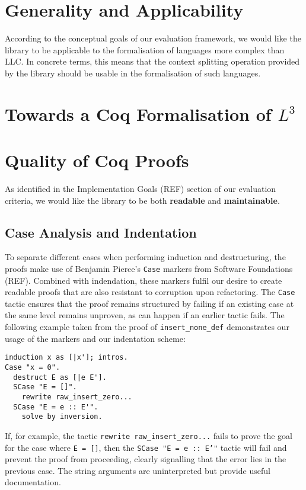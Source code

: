\documentclass[]{unswthesis}
\let\c\texttt
\let\b\textbf
\begin{document}
\section{Generality and Applicability}

According to the conceptual goals of our evaluation framework, we would like the library to be applicable to the formalisation of languages more complex than LLC. In concrete terms, this means that the context splitting operation provided by the library should be usable in the formalisation of such languages.

\section{Towards a Coq Formalisation of $L^3$}

\section{Quality of Coq Proofs}

As identified in the Implementation Goals (REF) section of our evaluation criteria, we would like the library to be both \b{readable} and \b{maintainable}.

\subsection{Case Analysis and Indentation}

To separate different cases when performing induction and destructuring, the proofs make use of Benjamin Pierce's \c{Case} markers from Software Foundations (REF). Combined with indendation, these markers fulfil our desire to create readable proofs that are also resistant to corruption upon refactoring. The \c{Case} tactic ensures that the proof remains structured by failing if an existing case at the same level remains unproven, as can happen if an earlier tactic fails. The following example taken from the proof of \c{insert_none_def} demonstrates our usage of the markers and our indentation scheme:

\begin{verbatim}
induction x as [|x']; intros.
Case "x = 0".
  destruct E as [|e E'].
  SCase "E = []".
    rewrite raw_insert_zero...
  SCase "E = e :: E'".
    solve by inversion.
\end{verbatim}

If, for example, the tactic \c{rewrite raw_insert_zero...} fails to prove the goal for the case where \c{E = []}, then the \c{SCase "E = e :: E'"} tactic will fail and prevent the proof from proceeding, clearly signalling that the error lies in the previous case. The string arguments are uninterpreted but provide useful documentation.
\end{document}
